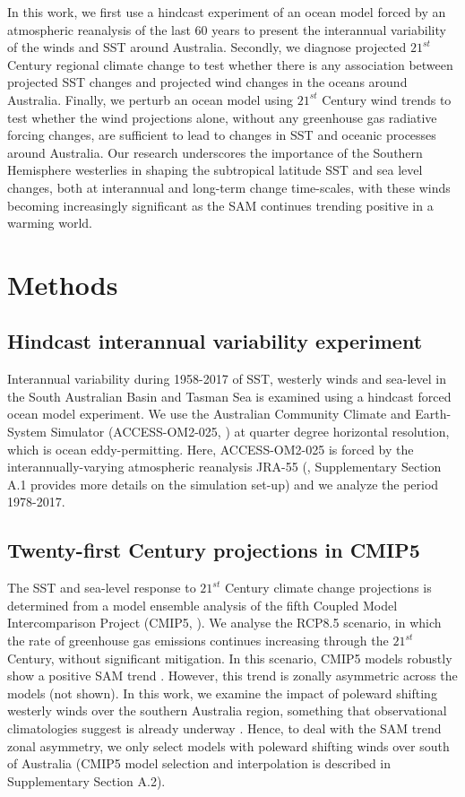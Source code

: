 \documentclass[draft,linenumbers]{agujournal2018}
\begin{document}
In this work, we first use a hindcast experiment of an ocean model forced by an atmospheric reanalysis of the last 60 years to present the interannual variability of the winds and SST around Australia. Secondly, we diagnose projected $21^{st}$ Century regional climate change to test whether there is any association between projected SST changes and projected wind changes in the oceans around Australia. Finally, we perturb an ocean model using $21^{st}$ Century wind trends to test whether the wind projections alone, without any greenhouse gas radiative forcing changes, are sufficient to lead to changes in SST and oceanic processes around Australia. Our research underscores the importance of the Southern Hemisphere westerlies in shaping the subtropical latitude SST and sea level changes, both at interannual and long-term change time-scales, with these winds becoming increasingly significant as the SAM continues trending positive in a warming world.

\section{Methods}
\subsection{Hindcast interannual variability experiment}
Interannual variability during 1958-2017 of SST, westerly winds and sea-level in the South Australian Basin and Tasman Sea is examined using a hindcast forced ocean model experiment. We use the Australian Community Climate and Earth-System Simulator (ACCESS-OM2-025, \citealp{Kiss2019}) at quarter degree horizontal resolution, which is ocean eddy-permitting. Here, ACCESS-OM2-025 is forced by the interannually-varying atmospheric reanalysis JRA-55 (\citealp{Kobayashi2015}, Supplementary Section A.1 provides more details on the simulation set-up) and we analyze the period 1978-2017.

\subsection{Twenty-first Century projections in CMIP5} \label{Twenty-first Century analysis in CMIP5}
The SST and sea-level response to $21^{st}$ Century climate change projections is determined from a model ensemble analysis of the fifth Coupled Model Intercomparison Project (CMIP5, \citealp{Taylor2012}). We analyse the RCP8.5 scenario, in which the rate of greenhouse gas emissions continues increasing through the $21^{st}$ Century, without significant mitigation. In this scenario, CMIP5 models robustly show a positive SAM trend \citep{Bracegirdle2013}. However, this trend is zonally asymmetric across the models (not shown). In this work, we examine the impact of poleward shifting westerly winds over the southern Australia region, something that observational climatologies suggest is already underway \citep{Reichler2016}. Hence, to deal with the SAM trend zonal asymmetry, we only select models with poleward shifting winds over south of Australia (CMIP5 model selection and interpolation is described in Supplementary Section A.2).
\end{document}
